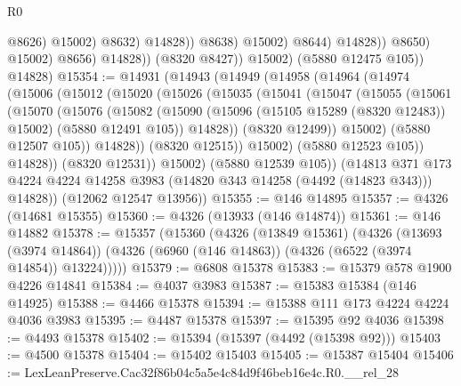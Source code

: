 \begin{lexlean}{R0}
\begin{coremodule}
                                          @8626)
                                        @15002)
                                      @8632)
                                    @14828))
                                @8638)
                              @15002)
                            @8644)
                          @14828))
                      @8650)
                    @15002)
                  @8656)
                @14828))
            (@8320 @8427))
          @15002)
        (@5880 @12475 @105))
      @14828)
@15354 := @14931
    (@14943
      (@14949
        (@14958
          (@14964
            (@14974
              (@15006
                (@15012
                  (@15020
                    (@15026
                      (@15035
                        (@15041
                          (@15047
                            (@15055
                              (@15061
                                (@15070
                                  (@15076
                                    (@15082
                                      (@15090
                                        (@15096 (@15105 @15289 (@8320 @12483)) @15002)
                                        (@5880 @12491 @105))
                                      @14828))
                                  (@8320 @12499))
                                @15002)
                              (@5880 @12507 @105))
                            @14828))
                        (@8320 @12515))
                      @15002)
                    (@5880 @12523 @105))
                  @14828))
              (@8320 @12531))
            @15002)
          (@5880 @12539 @105))
        (@14813
          @371
          @173
          @4224
          @4224
          @14258
          @3983
          (@14820 @343 @14258 (@4492 (@14823 @343)))
          @14828))
      (@12062 @12547 @13956))
@15355 := @146 @14895
@15357 := @4326 (@14681 @15355)
@15360 := @4326 (@13933 (@146 @14874))
@15361 := @146 @14882
@15378 := @15357
    (@15360
      (@4326
        (@13849 @15361)
        (@4326
          (@13693 (@3974 @14864))
          (@4326 (@6960 (@146 @14863)) (@4326 (@6522 (@3974 @14854)) @13224)))))
@15379 := @6808 @15378
@15383 := @15379 @578 @1900 @4226 @14841
@15384 := @4037 @3983
@15387 := @15383 @15384 (@146 @14925)
@15388 := @4466 @15378
@15394 := @15388 @111 @173 @4224 @4224 @4036 @3983
@15395 := @4487 @15378
@15397 := @15395 @92 @4036
@15398 := @4493 @15378
@15402 := @15394 (@15397 (@4492 (@15398 @92)))
@15403 := @4500 @15378
@15404 := @15402 @15403
@15405 := @15387 @15404
@15406 := LexLeanPreserve.Cac32f86b04c5a5e4c84d9f46beb16e4c.R0.__rel_28

\end{coremodule}
\end{lexlean}
